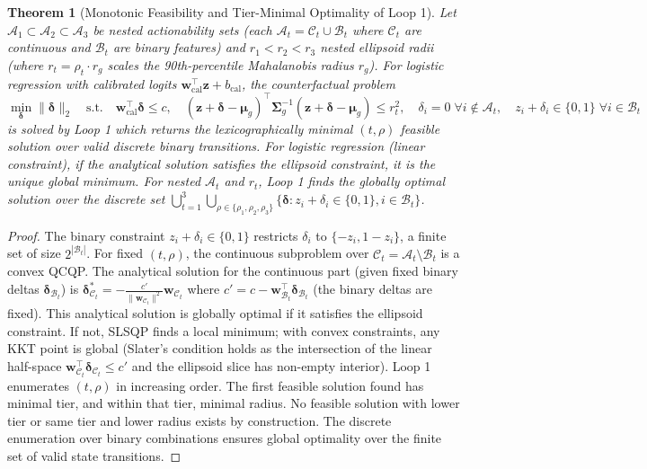 \documentclass[11pt,a4paper]{article}
\theoremstyle{plain}
\newtheorem{theorem}{Theorem}
\begin{document}
\begin{theorem}[Monotonic Feasibility and Tier-Minimal Optimality of Loop 1]
\label{thm:loop1_optimality}
Let $\mathcal{A}_1 \subset \mathcal{A}_2 \subset \mathcal{A}_3$ be nested actionability sets (each $\mathcal{A}_t = \mathcal{C}_t \cup \mathcal{B}_t$ where $\mathcal{C}_t$ are continuous and $\mathcal{B}_t$ are binary features) and $r_1 < r_2 < r_3$ nested ellipsoid radii (where $r_t = \rho_t \cdot r_g$ scales the 90th-percentile Mahalanobis radius $r_g$). For logistic regression with calibrated logits $\mathbf{w}_{\text{cal}}^\top \mathbf{z} + b_{\text{cal}}$, the counterfactual problem
\begin{equation}
\min_{\boldsymbol{\delta}} \|\boldsymbol{\delta}\|_2 \quad \text{s.t.} \quad \mathbf{w}_{\text{cal}}^\top \boldsymbol{\delta} \le c, \quad (\mathbf{z}+\boldsymbol{\delta}-\boldsymbol{\mu}_g)^\top \boldsymbol{\Sigma}_g^{-1}(\mathbf{z}+\boldsymbol{\delta}-\boldsymbol{\mu}_g) \le r_t^2, \quad \delta_i = 0 \;\forall i \notin \mathcal{A}_t, \quad z_i + \delta_i \in \{0,1\} \;\forall i \in \mathcal{B}_t
\end{equation}
is solved by Loop 1 which returns the lexicographically minimal $(t, \rho)$ feasible solution over valid discrete binary transitions. For logistic regression (linear constraint), if the analytical solution satisfies the ellipsoid constraint, it is the unique global minimum. For nested $\mathcal{A}_t$ and $r_t$, Loop 1 finds the globally optimal solution over the discrete set $\bigcup_{t=1}^3 \bigcup_{\rho \in \{\rho_1,\rho_2,\rho_3\}} \{\boldsymbol{\delta} : z_i+\delta_i \in \{0,1\}, i \in \mathcal{B}_t\}$.
\end{theorem}

\begin{proof}
The binary constraint $z_i + \delta_i \in \{0,1\}$ restricts $\delta_i$ to $\{-z_i, 1-z_i\}$, a finite set of size $2^{|\mathcal{B}_t|}$. For fixed $(t,\rho)$, the continuous subproblem over $\mathcal{C}_t = \mathcal{A}_t \setminus \mathcal{B}_t$ is a convex QCQP. The analytical solution for the continuous part (given fixed binary deltas $\boldsymbol{\delta}_{\mathcal{B}_t}$) is $\boldsymbol{\delta}_{\mathcal{C}_t}^* = -\frac{c'}{\|\mathbf{w}_{\mathcal{C}_t}\|^2}\mathbf{w}_{\mathcal{C}_t}$ where $c' = c - \mathbf{w}_{\mathcal{B}_t}^\top \boldsymbol{\delta}_{\mathcal{B}_t}$ (the binary deltas are fixed). This analytical solution is globally optimal if it satisfies the ellipsoid constraint. If not, SLSQP finds a local minimum; with convex constraints, any KKT point is global (Slater's condition holds as the intersection of the linear half-space $\mathbf{w}_{\mathcal{C}_t}^\top \boldsymbol{\delta}_{\mathcal{C}_t} \le c'$ and the ellipsoid slice has non-empty interior). Loop 1 enumerates $(t,\rho)$ in increasing order. The first feasible solution found has minimal tier, and within that tier, minimal radius. No feasible solution with lower tier or same tier and lower radius exists by construction. The discrete enumeration over binary combinations ensures global optimality over the finite set of valid state transitions.
\end{proof}
\end{document}
